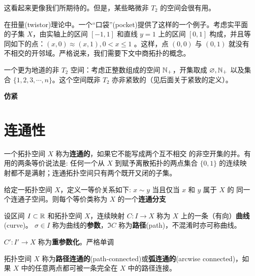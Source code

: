 这看起来更像我们所期待的。但是，某些略微非 $T_2$ 的空间会很有用。
\begin{eg}
    在扭量(twistor)理论中。一个“口袋”(pocket)提供了这样的一个例子。考虑实平面的子集 $X$，由实轴上的区间 $[-1,1]$ 和直线 $y=1$ 上的区间 $[0,1]$ 构成，并且等同如下的点：$(x,0) \approx(x,1),0<x \leqslant 1$ 。这样，点 $(0,0)$ 与 $(0,1)$ 就没有不相交的开邻域。严格说来，我们需要下文中商拓扑的概念。
\end{eg}

\begin{eg}
    一个更为地道的非 $T_2$ 空间：考虑正整数组成的空间 $\mathbb{N}_+$，开集取成 $\varnothing,\mathbb{N}_+$ 以及集合 $\{1,2,3,\cdots,n\}$。这个空间既非 $T_2$ 亦非紧致的（见后面关于紧致的定义）。
\end{eg}

\begin{definition}
    \textbf{仿紧}
\end{definition}

\section{连通性}

\begin{definition}
    一个拓扑空间 $X$ 称为\textbf{连通的}，如果它不能写成两个互不相交 的非空开集的并。有用的两条等价说法是: 任何一个从 $X$ 到赋予离散拓扑的两点集合 $\{0,1\}$ 的连续映射都不是满射；连通拓扑空间只有两个既开又闭的子集。

    给定一拓扑空间 $X$，定义一等价关系如下: $x \sim y$ 当且仅当 $x$ 和 $y$ 属于 $X$ 的 同一个连通子空间。则每个等价类称为 $X$ 的一个\textbf{连通分支}
\end{definition}

\begin{definition}
    设区间 $I\subset\mathbb{R}$ 和拓扑空间 $X$，连续映射 $C:I\to X$ 称为 $X$ 上的一条（有向）\textbf{曲线}(curve)。
    $\sigma\in I$ 称为曲线的\textbf{参数}，$\Im C$ 称为\textbf{路径}(path)，不混淆时亦可称曲线。
\end{definition}

\begin{definition}
    $C':I'\to X$ 称为\textbf{重参数化}。严格单调
\end{definition}

\begin{definition}
    拓扑空间 $X$ 称为\textbf{路径连通的}(path-connected)或\textbf{弧连通的}(arcwise connected)，如果 $X$ 中的任意两点都可被一条完全在 $X$ 中的路径连接。
\end{definition}

